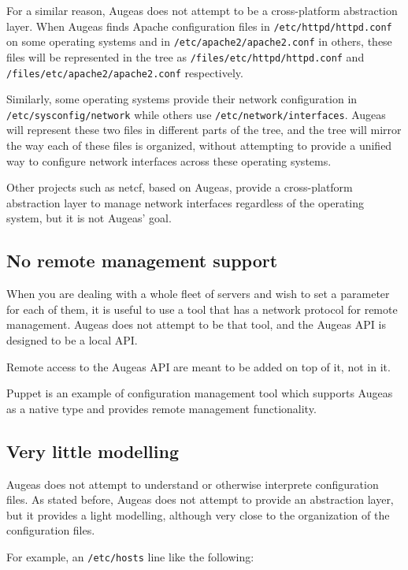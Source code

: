 For a similar reason, Augeas does not attempt to be a cross-platform abstraction layer. When Augeas finds Apache configuration files in \nolinkurl{/etc/httpd/httpd.conf} on some operating systems and in \nolinkurl{/etc/apache2/apache2.conf} in others, these files will be represented in the tree as \nolinkurl{/files/etc/httpd/httpd.conf} and \nolinkurl{/files/etc/apache2/apache2.conf} respectively.

Similarly, some operating systems provide their network configuration in \nolinkurl{/etc/sysconfig/network} while others use \nolinkurl{/etc/network/interfaces}. Augeas will represent these two files in different parts of the tree, and the tree will mirror the way each of these files is organized, without attempting to provide a unified way to configure network interfaces across these operating systems.

Other projects such as netcf, based on Augeas, provide a cross-platform abstraction layer to manage network interfaces regardless of the operating system, but it is not Augeas' goal.

\subsection{No remote management support}

When you are dealing with a whole fleet of servers and wish to set a parameter for each of them, it is useful to use a tool that has a network protocol for remote management. Augeas does not attempt to be that tool, and the Augeas API is designed to be a local API.

Remote access to the Augeas API are meant to be added on top of it, not in it.

Puppet is an example of configuration management tool which supports Augeas as a native type and provides remote management functionality.

\subsection{Very little modelling}

Augeas does not attempt to understand or otherwise interprete configuration files. As stated before, Augeas does not attempt to provide an abstraction layer, but it provides a light modelling, although very close to the organization of the configuration files.

For example, an \nolinkurl{/etc/hosts} line like the following:

